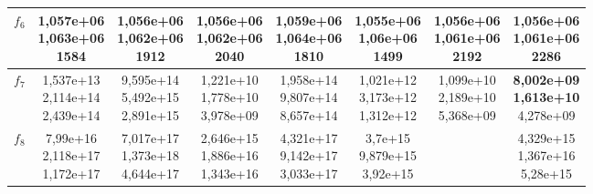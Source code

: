 \begin{table}[t]
\begin{small}
\begin{tabular}{|c|c|c|c|c|c|c|c|}
        $f_6$    & \makecell{1,057e+06 \\ 1,063e+06 \\ 1584}      & \makecell{1,056e+06 \\ 1,062e+06 \\ 1912}      & \makecell{1,056e+06 \\ 1,062e+06 \\ 2040}      & \makecell{1,059e+06 \\ 1,064e+06 \\ 1810}      & \makecell{\textbf{1,055e+06} \\ \textbf{1,06e+06} \\ 1499}       & \makecell{1,056e+06 \\ 1,061e+06 \\ 2192}      & \makecell{1,056e+06 \\ 1,061e+06 \\ 2286}      \\\hline
        $f_7$    & \makecell{1,537e+13 \\ 2,114e+14 \\ 2,439e+14} & \makecell{9,595e+14 \\ 5,492e+15 \\ 2,891e+15} & \makecell{1,221e+10 \\ 1,778e+10 \\ 3,978e+09} & \makecell{1,958e+14 \\ 9,807e+14 \\ 8,657e+14} & \makecell{1,021e+12 \\ 3,173e+12 \\ 1,312e+12} & \makecell{1,099e+10 \\ 2,189e+10 \\ 5,368e+09} & \makecell{\textbf{8,002e+09} \\ \textbf{1,613e+10} \\ 4,278e+09} \\\hline
        $f_8$    & \makecell{7,99e+16 \\ 2,118e+17 \\ 1,172e+17}  & \makecell{7,017e+17 \\ 1,373e+18 \\ 4,644e+17} & \makecell{2,646e+15 \\ 1,886e+16 \\ 1,343e+16} & \makecell{4,321e+17 \\ 9,142e+17 \\ 3,033e+17} & \makecell{3,7e+15 \\ 9,879e+15 \\ 3,92e+15}    & & \makecell{4,329e+15 \\ 1,367e+16 \\ 5,28e+15} \\\hline

\end{tabular}
\end{small}
\end{table}

